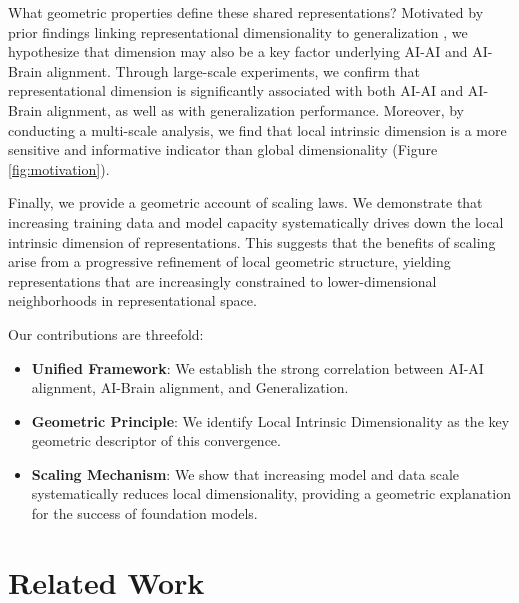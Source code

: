 \documentclass{article}
\theoremstyle{plain}
\theoremstyle{definition}
\theoremstyle{remark}
\begin{document}
What geometric properties define these shared representations? Motivated by prior findings linking representational dimensionality to generalization \citep{ansuini2019intrinsic}, we hypothesize that dimension may also be a key factor underlying AI-AI and AI-Brain alignment. Through large-scale experiments, we confirm that representational dimension is significantly associated with both AI-AI and AI-Brain alignment, as well as with generalization performance. Moreover, by conducting a multi-scale analysis, we find that local intrinsic dimension is a more sensitive and informative indicator than global dimensionality (Figure \ref{fig:motivation}).


Finally, we provide a geometric account of scaling laws. We demonstrate that increasing training data and model capacity systematically drives down the local intrinsic dimension of representations. This suggests that the benefits of scaling arise from a progressive refinement of local geometric structure, yielding representations that are increasingly constrained to lower-dimensional neighborhoods in representational space.


Our contributions are threefold:

\begin{itemize}[left=0pt,align=left]
    \item \textbf{Unified Framework}: We establish the strong correlation between AI-AI alignment, AI-Brain alignment, and Generalization.
    \item \textbf{Geometric Principle}: We identify Local Intrinsic Dimensionality as the key geometric descriptor of this convergence.
    \item \textbf{Scaling Mechanism}: We show that increasing model and data scale systematically reduces local dimensionality, providing a geometric explanation for the success of foundation models.
\end{itemize}




\section{Related Work}
\end{document}
